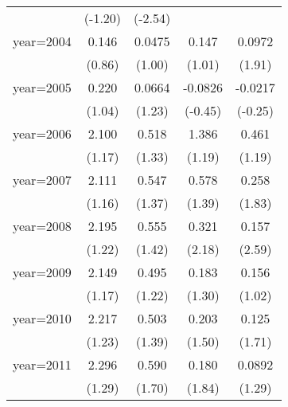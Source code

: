 \begin{table}[htbp]
\begin{tabular}{l*{4}{c}}
                    &     (-1.20)         &     (-2.54)         &                     &                     \\
\addlinespace
year=2004           &       0.146         &      0.0475         &       0.147         &      0.0972         \\
                    &      (0.86)         &      (1.00)         &      (1.01)         &      (1.91)         \\
\addlinespace
year=2005           &       0.220         &      0.0664         &     -0.0826         &     -0.0217         \\
                    &      (1.04)         &      (1.23)         &     (-0.45)         &     (-0.25)         \\
\addlinespace
year=2006           &       2.100         &       0.518         &       1.386         &       0.461         \\
                    &      (1.17)         &      (1.33)         &      (1.19)         &      (1.19)         \\
\addlinespace
year=2007           &       2.111         &       0.547         &       0.578         &       0.258         \\
                    &      (1.16)         &      (1.37)         &      (1.39)         &      (1.83)         \\
\addlinespace
year=2008           &       2.195         &       0.555         &       0.321\sym{*}  &       0.157\sym{**} \\
                    &      (1.22)         &      (1.42)         &      (2.18)         &      (2.59)         \\
\addlinespace
year=2009           &       2.149         &       0.495         &       0.183         &       0.156         \\
                    &      (1.17)         &      (1.22)         &      (1.30)         &      (1.02)         \\
\addlinespace
year=2010           &       2.217         &       0.503         &       0.203         &       0.125         \\
                    &      (1.23)         &      (1.39)         &      (1.50)         &      (1.71)         \\
\addlinespace
year=2011           &       2.296         &       0.590         &       0.180         &      0.0892         \\
                    &      (1.29)         &      (1.70)         &      (1.84)         &      (1.29)         \\

\end{tabular}
\end{table}
